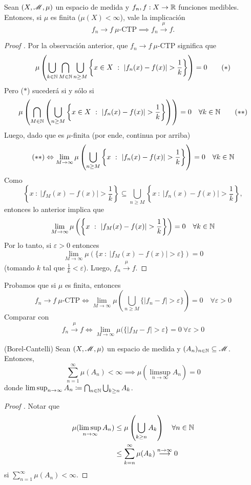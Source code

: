 \begin{prop}
	Sean $(X, \mathscr{M}, \mu)$ un espacio de medida y $f_n, f : X \to \mathbb{R}$ funciones medibles. Entonces, si $\mu$ es finita ($\mu(X) < \infty$), vale la implicación
	\[ f_n \longrightarrow f \ \mu \text{-CTP} \implies f_n \stackrel{\mu}{\longrightarrow} f. \]
\end{prop}
\begin{proof}[Proof ]
	Por la observación anterior, que $f_n \longrightarrow f \ \mu$-CTP significa que
	\[ \mu \left( \bigcup_{k\in\mathbb{N}} \bigcap_{M\in\mathbb{N}} \bigcup_{n \geq M} \left\{x \in X \ : \ | f_n(x) - f(x) | > \frac{1}{k}\right\} \right) = 0 \tag{$*$} \]
	Pero ($*$) sucederá si y sólo si
	\[ \mu \left( \bigcap_{M\in\mathbb{N}} \left( \bigcup_{n \geq M} \left\{x \in X \ : \ | f_n(x) - f(x) | > \frac{1}{k}\right\} \right) \right) = 0 \quad \forall k \in \mathbb{N} \tag{$**$} \]
	Luego, dado que  es $\mu$-finita (por ende, continua por arriba)
	\[ (**) \Leftrightarrow \lim_{M \to \infty} \mu \left( \bigcup_{n \geq M} \left\{x \ : \ | f_n(x) - f(x) | > \frac{1}{k}\right\} \right) = 0 \quad \forall k \in \mathbb{N} \]
	Como
	\[ \left\{x \ : \ | f_M(x) - f(x) | > \frac{1}{k}\right\} \subseteq \bigcup_{n \geq M} \left\{x \ : \ | f_n(x) - f(x) | > \frac{1}{k}\right\}, \]
	entonces lo anterior implica que
	\[ \lim_{M \to \infty} \mu \left( \left\{x \ : \ |f_M(x) - f(x) | > \frac{1}{k}\right\} \right) = 0 \quad \forall k \in \mathbb{N} \]
	Por lo tanto, si $\varepsilon > 0$ entonces
	\[ \lim_{M \to \infty} \mu(\{x \ : \ | f_M(x) - f(x) | > \varepsilon\}) = 0 \]
	(tomando $k$ tal que $\frac{1}{k} < \varepsilon$). Luego, $f_n \stackrel{\mu}{\longrightarrow} f$.
\end{proof}

\begin{remark}
	Probamos que si $\mu$ es finita, entonces
	\[ f_n \longrightarrow{} f \ \mu \text{-CTP} \iff \lim_{M \to \infty} \mu \left( \bigcup_{n \geq M} \{| f_n - f | > \varepsilon\} \right) = 0 \quad \forall \varepsilon > 0 \]
	Comparar con
	\[ f_n \stackrel{\mu}{\longrightarrow} f \iff \lim_{M \to \infty} \mu(\{| f_M - f | > \varepsilon\} = 0 \ \forall \varepsilon > 0 \]
\end{remark}

\begin{lemma}(Borel-Cantelli)
	Sean $(X, \mathscr{M}, \mu)$ un espacio de medida y $(A_n)_{n\in\mathbb{N}} \subseteq \mathscr{M}$. Entonces,
	\[ \sum_{n=1}^{\infty} \mu(A_n) < \infty \implies \mu(\limsup_{n \to \infty} A_n) = 0 \]
	donde $\limsup_{n \to \infty} A_n \coloneq \bigcap_{n\in\mathbb{N}} \bigcup_{k \geq n} A_k$.
\end{lemma}
\begin{proof}[Proof ]
	Notar que
	\begin{align*}
		\mu(\limsup_{n \to \infty} A_n) &\leq \mu \left( \bigcup_{k \geq n} A_k \right) \quad \forall n \in \mathbb{N} \\
		&\leq \sum_{k=n}^{\infty} \mu(A_k) \stackrel{n \to \infty}{\longrightarrow} 0
	\end{align*}
	si $\sum_{n=1}^{\infty} \mu(A_{n}) < \infty$.
\end{proof}
